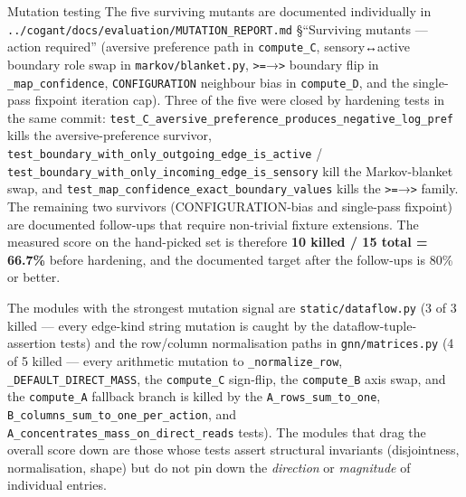 \documentclass[
  ignorenonframetext,
]{beamer}
\begin{document}
\begin{frame}[fragile]{Mutation testing}
The five surviving mutants are documented individually in
\texttt{../cogant/docs/evaluation/MUTATION\_REPORT.md} §``Surviving
mutants --- action required'' (aversive preference path in
\texttt{compute\_C}, sensory↔active boundary role swap in
\texttt{markov/blanket.py},
\texttt{\textgreater{}=}→\texttt{\textgreater{}} boundary flip in
\texttt{\_map\_confidence}, \texttt{CONFIGURATION} neighbour bias in
\texttt{compute\_D}, and the single-pass fixpoint iteration cap). Three
of the five were closed by hardening tests in the same commit:
\texttt{test\_C\_aversive\_preference\_produces\_negative\_log\_pref}
kills the aversive-preference survivor,
\texttt{test\_boundary\_with\_only\_outgoing\_edge\_is\_active} /
\texttt{test\_boundary\_with\_only\_incoming\_edge\_is\_sensory} kill
the Markov-blanket swap, and
\texttt{test\_map\_confidence\_exact\_boundary\_values} kills the
\texttt{\textgreater{}=}→\texttt{\textgreater{}} family. The remaining
two survivors (CONFIGURATION-bias and single-pass fixpoint) are
documented follow-ups that require non-trivial fixture extensions. The
measured score on the hand-picked set is therefore \textbf{10 killed /
15 total = 66.7\%} before hardening, and the documented target after the
follow-ups is 80\% or better.

The modules with the strongest mutation signal are
\texttt{static/dataflow.py} (3 of 3 killed --- every edge-kind string
mutation is caught by the dataflow-tuple-assertion tests) and the
row/column normalisation paths in \texttt{gnn/matrices.py} (4 of 5
killed --- every arithmetic mutation to \texttt{\_normalize\_row},
\texttt{\_DEFAULT\_DIRECT\_MASS}, the \texttt{compute\_C} sign-flip, the
\texttt{compute\_B} axis swap, and the \texttt{compute\_A} fallback
branch is killed by the \texttt{A\_rows\_sum\_to\_one},
\texttt{B\_columns\_sum\_to\_one\_per\_action}, and
\texttt{A\_concentrates\_mass\_on\_direct\_reads} tests). The modules
that drag the overall score down are those whose tests assert structural
invariants (disjointness, normalisation, shape) but do not pin down the
\emph{direction} or \emph{magnitude} of individual entries.
\end{frame}
\end{document}
